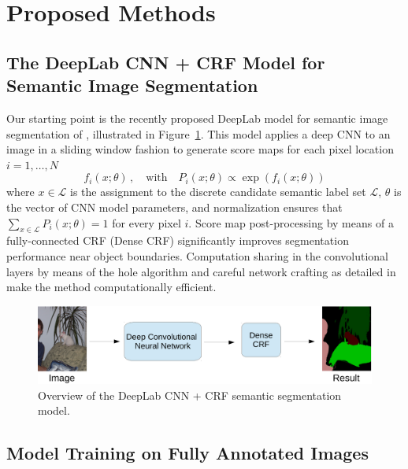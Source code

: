 \section{Proposed Methods}
\label{sec:methods}

\subsection{The DeepLab CNN + CRF Model for Semantic Image Segmentation}

Our starting point is the recently proposed DeepLab model for semantic
image segmentation of \citet{chen2014semantic}, illustrated in
Figure~\ref{fig:model_test}. This model applies a deep CNN to an image
in a sliding window fashion to generate score maps for each pixel
location $i = 1, \dots, N$
\begin{equation}
  \label{eq:scores}
  f_i(x; \theta) \,,
  \quad \mathrm{with} \quad
  P_i(x; \theta) \propto \exp \left( f_i(x; \theta) \right)
\end{equation}
where $x \in \mathcal{L}$ is the assignment to the discrete candidate
semantic label set $\mathcal{L}$, $\theta$ is the vector of CNN model
parameters, and normalization ensures that $\sum_{x \in  \mathcal{L}}
P_i(x; \theta) = 1$ for every pixel $i$. Score map post-processing by
means of a fully-connected CRF (Dense CRF)
\cite{krahenbuhl2011efficient} significantly improves segmentation
performance near object boundaries. Computation sharing in the
convolutional layers by means of the hole algorithm and careful
network crafting as detailed in \citet{chen2014semantic} make the
method computationally efficient.

\begin{figure}[htbp!]
  \centering
  \includegraphics[width=0.9\linewidth]{fig/model_test.pdf} 
  \caption{Overview of the DeepLab CNN + CRF semantic segmentation model.}
  \label{fig:model_test}
\end{figure}

\subsection{Model Training on Fully Annotated Images}
\label{sec:train_pixel}

